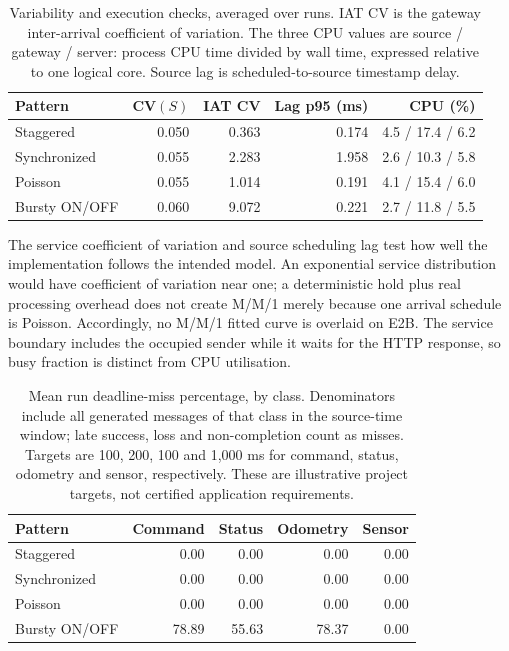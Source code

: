 \begin{table}[H]\centering
\small
\setlength{\tabcolsep}{5pt}
\begin{tabular}{lrrrr}
\hline
Pattern & CV$(S)$ & IAT CV & Lag p95 (ms) & CPU (\%) \\
\hline
Staggered & 0.050 & 0.363 & 0.174 & 4.5 / 17.4 / 6.2 \\
Synchronized & 0.055 & 2.283 & 1.958 & 2.6 / 10.3 / 5.8 \\
Poisson & 0.055 & 1.014 & 0.191 & 4.1 / 15.4 / 6.0 \\
Bursty ON/OFF & 0.060 & 9.072 & 0.221 & 2.7 / 11.8 / 5.5 \\
\hline
\end{tabular}
\caption{Variability and execution checks, averaged over runs. IAT CV is the gateway inter-arrival coefficient of variation. The three CPU values are source / gateway / server: process CPU time divided by wall time, expressed relative to one logical core. Source lag is scheduled-to-source timestamp delay.}
\label{tab:live_checks}
\end{table}

The service coefficient of variation and source scheduling lag test how well the implementation follows the intended model. An exponential service distribution would have coefficient of variation near one; a deterministic hold plus real processing overhead does not create M/M/1 merely because one arrival schedule is Poisson. Accordingly, no M/M/1 fitted curve is overlaid on E2B. The service boundary includes the occupied sender while it waits for the HTTP response, so busy fraction is distinct from CPU utilisation.

\begin{table}[H]\centering
\small
\setlength{\tabcolsep}{5pt}
\begin{tabular}{lrrrr}
\hline
Pattern & Command & Status & Odometry & Sensor \\
\hline
Staggered & 0.00 & 0.00 & 0.00 & 0.00 \\
Synchronized & 0.00 & 0.00 & 0.00 & 0.00 \\
Poisson & 0.00 & 0.00 & 0.00 & 0.00 \\
Bursty ON/OFF & 78.89 & 55.63 & 78.37 & 0.00 \\
\hline
\end{tabular}
\caption{Mean run deadline-miss percentage, by class. Denominators include all generated messages of that class in the source-time window; late success, loss and non-completion count as misses. Targets are 100, 200, 100 and 1,000 ms for command, status, odometry and sensor, respectively. These are illustrative project targets, not certified application requirements.}
\label{tab:class_deadlines}
\end{table}

